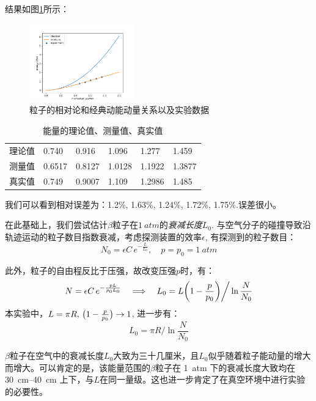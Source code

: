 \documentclass{buaaemp}
\begin{document}
\pagebreak
结果如图\ref{fig:my_label}所示：

\begin{figure}[htbp]
    \includegraphics[width=0.4\textwidth]{image/betaray.png}
    \caption{粒子的相对论和经典动能动量关系以及实验数据}
    \label{fig:my_label}
\end{figure}


\begin{table}[h]
    \centering
    \begin{tabular}{llllll}
         理论值 &0.740 & 0.916 &1.096 &1.277 &1.459  \\
         测量值 &0.6517 &0.8127 &1.0128 &1.1922 &1.3877 \\
         真实值 &0.749 &0.9007 &1.109 &1.2986 &1.485
    \end{tabular}
    \caption{能量的理论值、测量值、真实值}
    \label{tab:my_label}
\end{table}

我们可以看到相对误差为：1.2\%, 1.63\%, 1.24\%, 1.72\%, 1.75\%.误差很小。




在此基础上，我们尝试估计$\beta$粒子在$\SI{1}{atm}$的\textit{衰减长度}$L_0$. 与空气分子的碰撞导致沿轨迹运动的粒子数目指数衰减，考虑探测装置的效率$\epsilon$, 有探测到的粒子数目：
	\begin{equation}
		N_0 = \epsilon C\,e^{-\frac{L}{L_0}},\quad
		p = p_0 = \SI{1}{atm}
	\end{equation}
	
	此外，粒子的自由程反比于压强，故改变压强$p$时，有：
	\begin{equation}
		N = \epsilon C\,e^{-\frac{pL}{p_0 L_0}}\quad
		\Longrightarrow\quad
		L_0 = L\pqty{1 - \frac{p}{p_0}} \bigg/ \ln\frac{N}{N_0}
	\end{equation}
	本实验中，$L = \pi R,\,\pqty\big{1 - \frac{p}{p_0}} \to 1$, 进一步有：
	\begin{equation}
		L_0 = \pi R \bigg/ \ln\frac{N}{N_0}
	\end{equation}

 $\beta$粒子在空气中的衰减长度$L_0$大致为三十几厘米，且$L_0$似乎随着粒子能动量的增大而增大。可以肯定的是，该能量范围的$\beta$粒子在 \SI{1}{atm} 下的衰减长度大致均在 \SIrange{30}{40}{cm} 上下，与$L$在同一量级。这也进一步肯定了在真空环境中进行实验的必要性。
\end{document}
